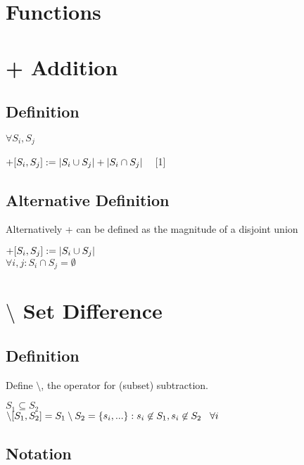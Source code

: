 \documentclass[11pt]{article}
\begin{document}
\section*{Functions}






\section{+ Addition}
\subsection{Definition}
$\forall S_i,S_j$
\begin{center}
$
+\lbrack S_i,S_j\rbrack := |S_i \cup S_j| +  |S_i \cap S_j| \hspace{3mm}
$
[1]
\end{center}
\subsection{Alternative Definition}
Alternatively + can be defined as the magnitude of a disjoint union
\begin{center}
$
+[S_i,S_j] := |S_i \cup S_j| \hspace{3mm}
$\\ \vspace{2mm}
$
\forall i,j : S_i \cap S_j = \emptyset
$
\end{center}





\section{$\setminus$ Set Difference}
\subsection{Definition}
Define $\setminus$, the operator for (subset) subtraction.
\begin{center}
$ S_1 \subseteq S_2
$
\\
$
\setminus[S_1,S_2] = S_1 \setminus S_2 = \{s_i,...\} : s_i \not \in S_1,s_i \not \in S_2 \hspace{3mm} \forall i
$
\end{center}
\subsection{Notation}
\end{document}
